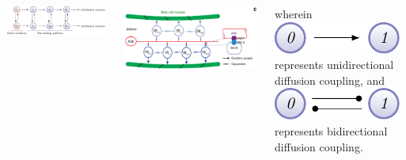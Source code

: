 \documentclass[25pt, a0paper, landscape, fleqn]{tikzposter}
\begin{document}
\begin{columns}
{  \begin{minipage}[b]{0.15\pagewidth}
    \begin{tikzfigure}
      \centering
      \includegraphics[width = 0.125\pagewidth]{./Figures/CPG/CPG.pdf}
    \end{tikzfigure}
  \end{minipage}
  \begin{minipage}[b]{0.15\pagewidth}
    \begin{tikzfigure}
      \centering
      \includegraphics{./Figures/xu_cpg.png}
    \end{tikzfigure}
  \end{minipage}

  wherein \includegraphics[height = 0.65\baselineskip]{./Figures/2sh/2sh.pdf} represents unidirectional diffusion coupling, and \includegraphics[height = 0.65\baselineskip]{./Figures/2dh/2dh.pdf} represents bidirectional diffusion coupling.
  }


\end{columns}
\end{document}
